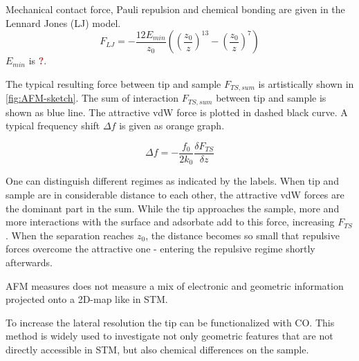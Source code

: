 Mechanical contact force, Pauli repulsion and chemical bonding are given in the Lennard Jones (LJ) model\cite{jones_determination_1924}.
\begin{equation} \label{eq:LJ}
 F_{LJ} = - \frac{12 E_{min}}{z_0} \left ( \left (\frac{z_0}{z} \right ) ^{13} - \left ( \frac{z_0}{z} \right )^7 \right )
\end{equation}
$E_{min}$ is \textcolor{red}{\textbf{?}}.

The typical resulting force between tip and sample $F_{TS,sum}$ is artistically shown in \autoref{fig:AFM-sketch}. 
The sum of interaction $F_{TS,sum}$ between tip and sample is shown as blue  line. The attractive vdW force is plotted in dashed black curve. A typical frequency shift $\Delta f$ is given as orange graph. 

$$\Delta f = - \frac{f_0}{2k_0}\frac{\delta F_{TS}}{\delta z}$$

One can distinguish different regimes as indicated by the labels. When tip and sample are in considerable distance to each other, the attractive vdW forces are the dominant part in the sum. While the tip approaches the sample, more and more interactions with the surface and adsorbate add to this force, increasing $F_{TS}$. When the separation reaches $z_0$, the distance becomes so small that repulsive forces overcome the attractive one - entering the repulsive regime shortly afterwards. 


AFM measures does not measure a mix of electronic and geometric information projected onto a 2D-map like in STM.

To increase the lateral resolution the tip can be functionalized with CO. This method is widely used \cite{albrecht_direct_2016, kawai_multiple_2018, kawai_atomically_2015, schulz_elemental_2018, gross_chemical_2009, pavlicek_generation_2017, schwarz_corrugation_2017} to investigate not only geometric features that are not directly accessible in STM, but also chemical differences on the sample\cite{wang_exploration_2017}.

